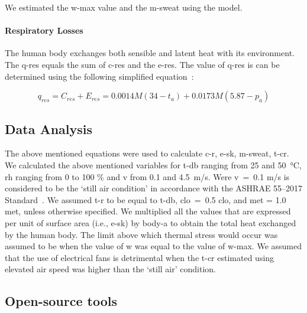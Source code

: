 We estimated the \ac{w-max} value and the \ac{m-sweat} using the  model.


\paragraph{Respiratory Losses}
The human body exchanges both sensible and latent heat with its environment.
The \ac{q-res} equals the sum of \ac{c-res} and the \ac{e-res}.
The value of \ac{q-res} is can be determined using the following simplified equation~\cite{ASHRA2017}:

\begin{equation}
    q_{res} = C_{res} + E_{res} = 0.0014M(34-t_{a}) + 0.0173M(5.87-p_{a})\label{eq:respiratory-losses}
\end{equation}

\subsection{Data Analysis}\label{subsec:data-analysis}

The above mentioned equations were used to calculate \ac{c-r}, \ac{e-sk}, \ac{m-sweat}, \ac{t-cr}.
We calculated the above mentioned variables for \ac{t-db} ranging from 25 and 50~°C, \ac{rh} ranging from 0 to 100 \% and \ac{v} from 0.1 and 4.5~m/s.
Were \ac{v}~=~0.1 m/s is considered to be the `still air condition' in accordance with the ASHRAE 55--2017 Standard~\cite{ashrae552017}.
We assumed \ac{t-r} to be equal to \ac{t-db}, \ac{clo}~=~0.5 clo, and \ac{met} = 1.0 met, unless otherwise specified.
We multiplied all the values that are expressed per unit of surface area (i.e., \ac{e-sk}) by \ac{body-a} to obtain the total heat exchanged by the human body.
The limit above which thermal stress would occur was assumed to be when the value of \ac{w} was equal to the value of \ac{w-max}.
We assumed that the use of electrical fans is detrimental when the \ac{t-cr} estimated using elevated air speed was higher than the `still air' condition.


\subsection{Open-source tools}

